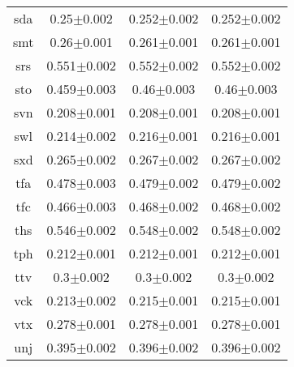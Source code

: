 \documentclass{article}
\begin{document}
\begin{tabular}{|c|ccc|}
sda & 0.25$\pm$0.002 & 0.252$\pm$0.002 & 0.252$\pm$0.002 \\ 
smt & 0.26$\pm$0.001 & 0.261$\pm$0.001 & 0.261$\pm$0.001 \\ 
srs & 0.551$\pm$0.002 & 0.552$\pm$0.002 & 0.552$\pm$0.002 \\ 
sto & 0.459$\pm$0.003 & 0.46$\pm$0.003 & 0.46$\pm$0.003 \\ 
svn & 0.208$\pm$0.001 & 0.208$\pm$0.001 & 0.208$\pm$0.001 \\ 
swl & 0.214$\pm$0.002 & 0.216$\pm$0.001 & 0.216$\pm$0.001 \\ 
sxd & 0.265$\pm$0.002 & 0.267$\pm$0.002 & 0.267$\pm$0.002 \\ 
tfa & 0.478$\pm$0.003 & 0.479$\pm$0.002 & 0.479$\pm$0.002 \\ 
tfc & 0.466$\pm$0.003 & 0.468$\pm$0.002 & 0.468$\pm$0.002 \\ 
ths & 0.546$\pm$0.002 & 0.548$\pm$0.002 & 0.548$\pm$0.002 \\ 
tph & 0.212$\pm$0.001 & 0.212$\pm$0.001 & 0.212$\pm$0.001 \\ 
ttv & 0.3$\pm$0.002 & 0.3$\pm$0.002 & 0.3$\pm$0.002 \\ 
vck & 0.213$\pm$0.002 & 0.215$\pm$0.001 & 0.215$\pm$0.001 \\ 
vtx & 0.278$\pm$0.001 & 0.278$\pm$0.001 & 0.278$\pm$0.001 \\ 
unj & 0.395$\pm$0.002 & 0.396$\pm$0.002 & 0.396$\pm$0.002 \\ 
\hline \end{tabular}
\end{document}
